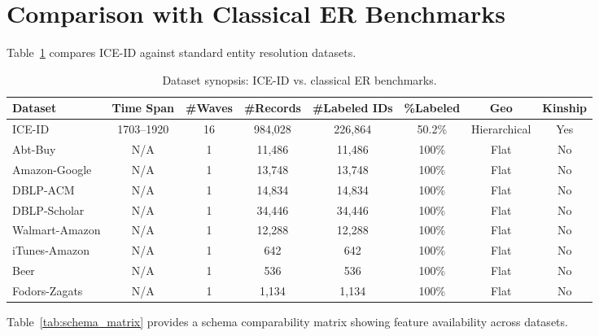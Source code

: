 \documentclass{article}
\begin{document}

\section{Comparison with Classical ER Benchmarks}
\label{sec:comparison}

Table~\ref{tab:dataset_synopsis} compares ICE-ID against standard entity resolution datasets.

\begin{table}[ht]
  \centering
  \caption{Dataset synopsis: ICE-ID vs. classical ER benchmarks.}
  \label{tab:dataset_synopsis}
  \scriptsize
  \begin{tabular}{lccccccc}
    \toprule
    \textbf{Dataset} & \textbf{Time Span} & \textbf{\#Waves} & \textbf{\#Records} & \textbf{\#Labeled IDs} & \textbf{\%Labeled} & \textbf{Geo} & \textbf{Kinship} \\
    \midrule
    ICE-ID & 1703--1920 & 16 & 984,028 & 226,864 & 50.2\% & Hierarchical & Yes \\
    Abt-Buy & N/A & 1 & 11,486 & 11,486 & 100\% & Flat & No \\
    Amazon-Google & N/A & 1 & 13,748 & 13,748 & 100\% & Flat & No \\
    DBLP-ACM & N/A & 1 & 14,834 & 14,834 & 100\% & Flat & No \\
    DBLP-Scholar & N/A & 1 & 34,446 & 34,446 & 100\% & Flat & No \\
    Walmart-Amazon & N/A & 1 & 12,288 & 12,288 & 100\% & Flat & No \\
    iTunes-Amazon & N/A & 1 & 642 & 642 & 100\% & Flat & No \\
    Beer & N/A & 1 & 536 & 536 & 100\% & Flat & No \\
    Fodors-Zagats & N/A & 1 & 1,134 & 1,134 & 100\% & Flat & No \\
    \bottomrule
  \end{tabular}
\end{table}

Table~\ref{tab:schema_matrix} provides a schema comparability matrix showing feature availability across datasets.
\end{document}
